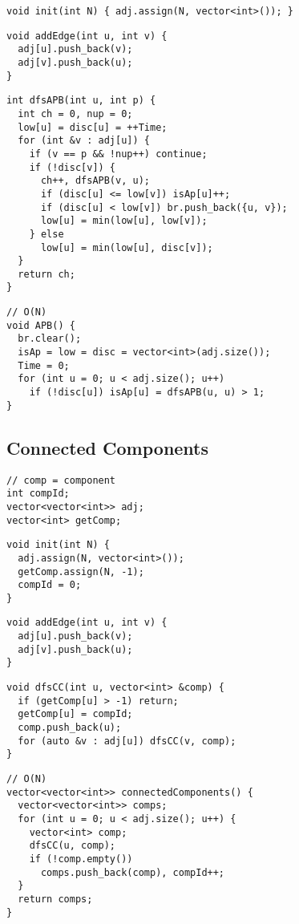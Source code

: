 \documentclass[twoside]{article}
\begin{document}
\begin{multicols*}{2}
\begin{verbatim}
void init(int N) { adj.assign(N, vector<int>()); }
\end{verbatim}
\vspace{-12pt}
\begin{verbatim}
void addEdge(int u, int v) {
  adj[u].push_back(v);
  adj[v].push_back(u);
}
\end{verbatim}
\vspace{-12pt}
\begin{verbatim}
int dfsAPB(int u, int p) {
  int ch = 0, nup = 0;
  low[u] = disc[u] = ++Time;
  for (int &v : adj[u]) {
    if (v == p && !nup++) continue;
    if (!disc[v]) {
      ch++, dfsAPB(v, u);
      if (disc[u] <= low[v]) isAp[u]++;
      if (disc[u] < low[v]) br.push_back({u, v});
      low[u] = min(low[u], low[v]);
    } else
      low[u] = min(low[u], disc[v]);
  }
  return ch;
}
\end{verbatim}
\vspace{-12pt}
\begin{verbatim}
// O(N)
void APB() {
  br.clear();
  isAp = low = disc = vector<int>(adj.size());
  Time = 0;
  for (int u = 0; u < adj.size(); u++)
    if (!disc[u]) isAp[u] = dfsAPB(u, u) > 1;
}
\end{verbatim}

\subsectionfont{\large\bfseries\sffamily\underline}
\subsection*{Connected Components}
\begin{verbatim}
// comp = component
int compId;
vector<vector<int>> adj;
vector<int> getComp;
\end{verbatim}
\vspace{-12pt}
\begin{verbatim}
void init(int N) {
  adj.assign(N, vector<int>());
  getComp.assign(N, -1);
  compId = 0;
}
\end{verbatim}
\vspace{-12pt}
\begin{verbatim}
void addEdge(int u, int v) {
  adj[u].push_back(v);
  adj[v].push_back(u);
}
\end{verbatim}
\vspace{-12pt}
\begin{verbatim}
void dfsCC(int u, vector<int> &comp) {
  if (getComp[u] > -1) return;
  getComp[u] = compId;
  comp.push_back(u);
  for (auto &v : adj[u]) dfsCC(v, comp);
}
\end{verbatim}
\vspace{-12pt}
\begin{verbatim}
// O(N)
vector<vector<int>> connectedComponents() {
  vector<vector<int>> comps;
  for (int u = 0; u < adj.size(); u++) {
    vector<int> comp;
    dfsCC(u, comp);
    if (!comp.empty())
      comps.push_back(comp), compId++;
  }
  return comps;
}
\end{verbatim}


\end{multicols*}
\end{document}
